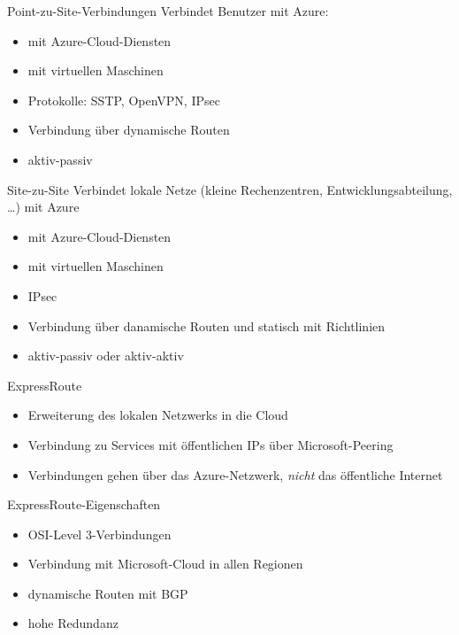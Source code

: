 \begin{flashcard}[]{Point-zu-Site-Verbindungen}
  Verbindet Benutzer mit Azure:
  \begin{itemize}
    \item mit Azure-Cloud-Diensten
    \item mit virtuellen Maschinen
    \item Protokolle: SSTP, OpenVPN, IPsec
    \item Verbindung über dynamische Routen
    \item aktiv-passiv
  \end{itemize}
\end{flashcard}

\begin{flashcard}[]{Site-zu-Site}
  Verbindet lokale Netze (kleine Rechenzentren, Entwicklungsabteilung, \ldots) mit Azure
  \begin{itemize}
    \item mit Azure-Cloud-Diensten
    \item mit virtuellen Maschinen
    \item IPsec
    \item Verbindung über danamische Routen und statisch mit Richtlinien
    \item aktiv-passiv oder aktiv-aktiv
  \end{itemize}
\end{flashcard}

\begin{flashcard}[]{ExpressRoute}
  \begin{itemize}
    \item Erweiterung des lokalen Netzwerks in die Cloud
    \item Verbindung zu Services mit öffentlichen IPs über Microsoft-Peering
    \item Verbindungen gehen über das Azure-Netzwerk, \emph{nicht} das öffentliche Internet
  \end{itemize}
\end{flashcard}

\begin{flashcard}[]{ExpressRoute-Eigenschaften}
  \begin{itemize}
    \item OSI-Level 3-Verbindungen
    \item Verbindung mit Microsoft-Cloud in allen Regionen
    \item dynamische Routen mit BGP
    \item hohe Redundanz
  \end{itemize}
\end{flashcard}

